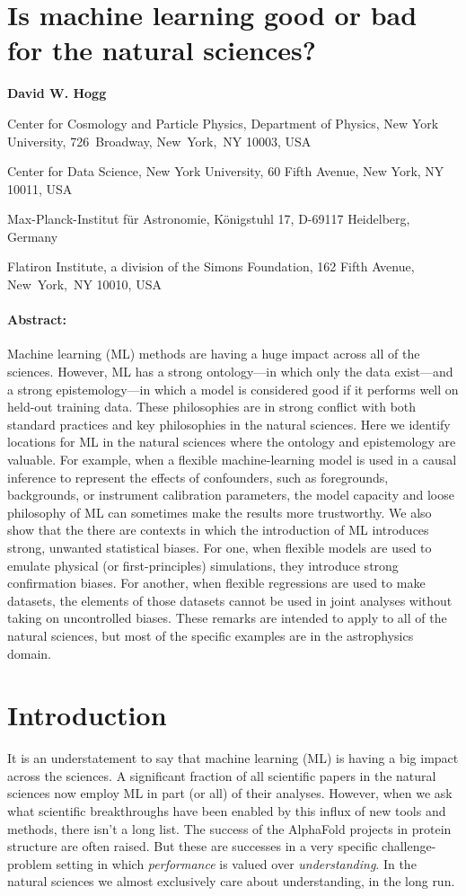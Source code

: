 \documentclass[11pt]{article}
\renewenvironment{abstract}{\paragraph{Abstract:}}{}
\renewcommand{\author}[1]{\medskip\par\noindent\textbf{#1}}
\newcommand{\affil}[1]{{\footnotesize\par\noindent #1 \par}}
\begin{document}
\section*{Is machine learning good or bad for the natural sciences?}

\author{David W. Hogg}
\affil{Center for Cosmology and Particle Physics, Department of Physics, New York University, 726~Broadway, New~York,~NY 10003, USA}
\affil{Center for Data Science, New York University, 60 Fifth Avenue, New York, NY 10011, USA}
\affil{Max-Planck-Institut f{\"u}r Astronomie, K{\"o}nigstuhl 17, D-69117 Heidelberg, Germany}
\affil{Flatiron Institute, a division of the Simons Foundation, 162 Fifth Avenue, New~York,~NY 10010, USA}

\begin{abstract}
  Machine learning (ML) methods are having a huge impact across all of the sciences.
  However, ML has a strong ontology---in which only the data exist---and a strong epistemology---in which a model is considered good if it performs well on held-out training data.
  These philosophies are in strong conflict with both standard practices and key philosophies in the natural sciences.
  Here we identify locations for ML in the natural sciences where the ontology and epistemology are valuable.
  For example, when a flexible machine-learning model is used in a causal inference to represent the effects of confounders, such as foregrounds, backgrounds, or instrument calibration parameters, the model capacity and loose philosophy of ML can sometimes make the results more trustworthy.
  We also show that the there are contexts in which the introduction of ML introduces strong, unwanted statistical biases.
  For one, when flexible models are used to emulate physical (or first-principles) simulations, they introduce strong confirmation biases.
  For another, when flexible regressions are used to make datasets, the elements of those datasets cannot be used in joint analyses without taking on uncontrolled biases.
  These remarks are intended to apply to all of the natural sciences, but most of the specific examples are in the astrophysics domain.
\end{abstract}

\section{Introduction}\label{sec:intro}

It is an understatement to say that machine learning (ML) is having a big impact across the sciences.
A significant fraction of all scientific papers in the natural sciences now employ ML in part (or all) of their analyses.
However, when we ask what scientific breakthroughs have been enabled by this influx of new tools and methods, there isn't a long list.
The success of the AlphaFold projects in protein structure \cite{alphafold} are often raised.
But these are successes in a very specific challenge-problem setting in which \emph{performance} is valued over \emph{understanding}.
In the natural sciences we almost exclusively care about understanding, in the long run.
\end{document}
